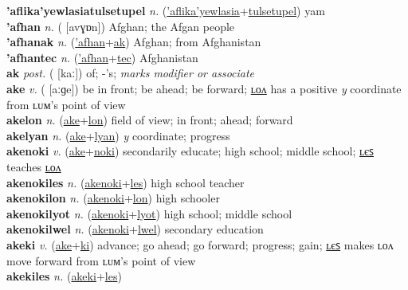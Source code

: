 \textbf{'aflika'yewlasiatulsetupel} \textit{n.} (\hyperref['aflika'yewlasia]{'aflika'yewlasia}+\hyperref[tulsetupel]{tulsetupel})
yam \label{'aflika'yewlasiatulsetupel} \\
\textbf{'afhan} \textit{n.} ( [avɣɒn])
Afghan; the Afgan people \label{'afhan} \\
\textbf{'afhanak} \textit{n.} (\hyperref['afhan]{'afhan}+\hyperref[ak]{ak})
Afghan; from Afghanistan \label{'afhanak} \\
\textbf{'afhantec} \textit{n.} (\hyperref['afhan]{'afhan}+\hyperref[tec]{tec})
Afghanistan \label{'afhantec} \\
\textbf{ak} \textit{post.} ( [kaː])
of; -’s; \textit{marks modifier or associate} \label{ak} \\
\textbf{ake} \textit{v.} ( [aːɡe])
be in front; be ahead; be forward; \hyperref[akelon]{ʟᴏᴧ} has a positive \textit{y} coordinate from ʟᴜᴍ’s point of view \label{ake} \\
\textbf{akelon} \textit{n.} (\hyperref[ake]{ake}+\hyperref[lon]{lon})
field of view; in front; ahead; forward \label{akelon} \\
\textbf{akelyan} \textit{n.} (\hyperref[ake]{ake}+\hyperref[lyan]{lyan})
\textit{y} coordinate; progress \label{akelyan} \\
\textbf{akenoki} \textit{v.} (\hyperref[ake]{ake}+\hyperref[noki]{noki})
secondarily educate; high school; middle school; \hyperref[akenokiles]{ʟєꜱ} teaches \hyperref[akenokilon]{ʟᴏᴧ} \label{akenoki} \\
\textbf{akenokiles} \textit{n.} (\hyperref[akenoki]{akenoki}+\hyperref[les]{les})
high school teacher \label{akenokiles} \\
\textbf{akenokilon} \textit{n.} (\hyperref[akenoki]{akenoki}+\hyperref[lon]{lon})
high schooler \label{akenokilon} \\
\textbf{akenokilyot} \textit{n.} (\hyperref[akenoki]{akenoki}+\hyperref[lyot]{lyot})
high school; middle school \label{akenokilyot} \\
\textbf{akenokilwel} \textit{n.} (\hyperref[akenoki]{akenoki}+\hyperref[lwel]{lwel})
secondary education \label{akenokilwel} \\
\textbf{akeki} \textit{v.} (\hyperref[ake]{ake}+\hyperref[ki]{ki})
advance; go ahead; go forward; progress; gain; \hyperref[akekiles]{ʟєꜱ} makes ʟᴏᴧ move forward from ʟᴜᴍ’s point of view \label{akeki} \\
\textbf{akekiles} \textit{n.} (\hyperref[akeki]{akeki}+\hyperref[les]{les})

